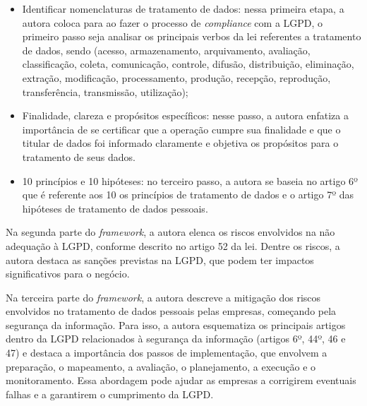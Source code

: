 \documentclass[
	12pt,				%
	openright,			%
	oneside,			%
	a4paper,			%
	english,			%
	french,				%
	spanish,			%
	brazil,				%
	]{abntex2}
\begin{document}
\begin{itemize}
\item Identificar nomenclaturas de tratamento de dados: nessa primeira etapa, a autora coloca para ao fazer o processo de \textit{compliance} com a LGPD, o primeiro passo seja analisar os principais verbos da lei referentes a tratamento de dados, sendo (acesso, armazenamento, arquivamento, avaliação, classificação, coleta, comunicação, controle, difusão, distribuição, eliminação, extração, modificação, processamento, produção, recepção, reprodução, transferência, transmissão, utilização);
\item Finalidade, clareza e propósitos específicos: nesse passo, a autora enfatiza a importância de se certificar que a operação cumpre sua finalidade e que o titular de dados foi informado claramente e objetiva os propósitos para o tratamento de seus dados.
\item 10 princípios e 10 hipóteses: no terceiro passo, a autora se baseia no artigo 6º que é referente aos 10 os princípios de tratamento de dados e o artigo 7º das hipóteses de tratamento de dados pessoais.
\end{itemize}

Na segunda parte do \textit{framework}, a autora elenca os riscos envolvidos na não adequação à LGPD, conforme descrito no artigo 52 da lei. Dentre os riscos, a autora destaca as sanções previstas na LGPD, que podem ter impactos significativos para o negócio.

Na terceira parte do \textit{framework}, a autora descreve a mitigação dos riscos envolvidos no tratamento de dados pessoais pelas empresas, começando pela segurança da informação. Para isso, a autora esquematiza os principais artigos dentro da LGPD relacionados à segurança da informação (artigos 6º, 44º, 46 e 47) e destaca a importância dos passos de implementação, que envolvem a preparação, o mapeamento, a avaliação, o planejamento, a execução e o monitoramento. Essa abordagem pode ajudar as empresas a corrigirem eventuais falhas e a garantirem o cumprimento da LGPD.
\end{document}
